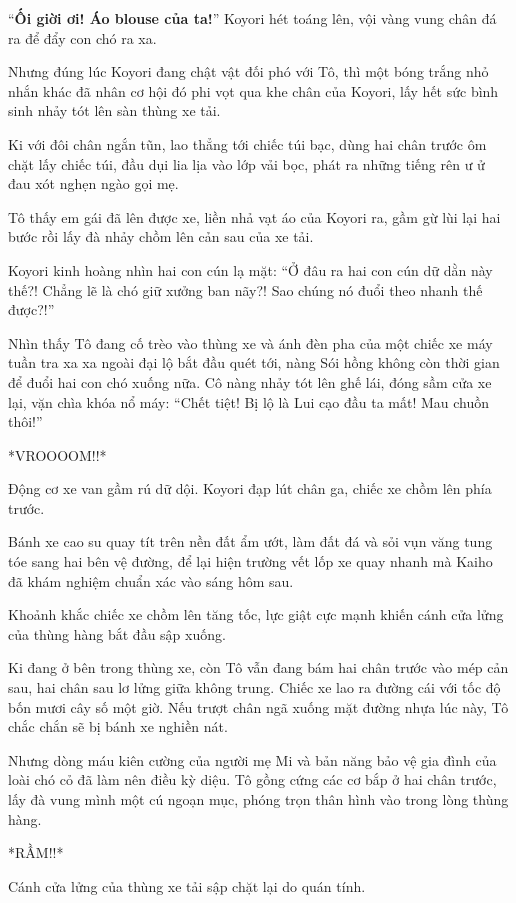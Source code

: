 \documentclass[../main.tex]{subfiles}
\begin{document}
``\textbf{Ối giời ơi! Áo blouse của ta!}'' Koyori hét toáng lên, vội vàng vung chân đá ra để đẩy con chó ra xa.

Nhưng đúng lúc Koyori đang chật vật đối phó với Tô, thì một bóng trắng nhỏ nhắn khác đã nhân cơ hội đó phi vọt qua khe chân của Koyori, lấy hết sức bình sinh nhảy tót lên sàn thùng xe tải.

Ki với đôi chân ngắn tũn, lao thẳng tới chiếc túi bạc, dùng hai chân trước ôm chặt lấy chiếc túi, đầu dụi lia lịa vào lớp vải bọc, phát ra những tiếng rên ư ử đau xót nghẹn ngào gọi mẹ.

Tô thấy em gái đã lên được xe, liền nhả vạt áo của Koyori ra, gầm gừ lùi lại hai bước rồi lấy đà nhảy chồm lên cản sau của xe tải.

Koyori kinh hoàng nhìn hai con cún lạ mặt: ``Ở đâu ra hai con cún dữ dằn này thế?! Chẳng lẽ là chó giữ xưởng ban nãy?! Sao chúng nó đuổi theo nhanh thế được?!''

Nhìn thấy Tô đang cố trèo vào thùng xe và ánh đèn pha của một chiếc xe máy tuần tra xa xa ngoài đại lộ bắt đầu quét tới, nàng Sói hồng không còn thời gian để đuổi hai con chó xuống nữa. Cô nàng nhảy tót lên ghế lái, đóng sầm cửa xe lại, vặn chìa khóa nổ máy: ``Chết tiệt! Bị lộ là Lui cạo đầu ta mất! Mau chuồn thôi!''

*VROOOOM!!*

Động cơ xe van gầm rú dữ dội. Koyori đạp lút chân ga, chiếc xe chồm lên phía trước.

Bánh xe cao su quay tít trên nền đất ẩm ướt, làm đất đá và sỏi vụn văng tung tóe sang hai bên vệ đường, để lại hiện trường vết lốp xe quay nhanh mà Kaiho đã khám nghiệm chuẩn xác vào sáng hôm sau.

Khoảnh khắc chiếc xe chồm lên tăng tốc, lực giật cực mạnh khiến cánh cửa lửng của thùng hàng bắt đầu sập xuống.

Ki đang ở bên trong thùng xe, còn Tô vẫn đang bám hai chân trước vào mép cản sau, hai chân sau lơ lửng giữa không trung. Chiếc xe lao ra đường cái với tốc độ bốn mươi cây số một giờ. Nếu trượt chân ngã xuống mặt đường nhựa lúc này, Tô chắc chắn sẽ bị bánh xe nghiền nát.

Nhưng dòng máu kiên cường của người mẹ Mi và bản năng bảo vệ gia đình của loài chó cỏ đã làm nên điều kỳ diệu. Tô gồng cứng các cơ bắp ở hai chân trước, lấy đà vung mình một cú ngoạn mục, phóng trọn thân hình vào trong lòng thùng hàng.

*RẦM!!*

Cánh cửa lửng của thùng xe tải sập chặt lại do quán tính.
\end{document}
